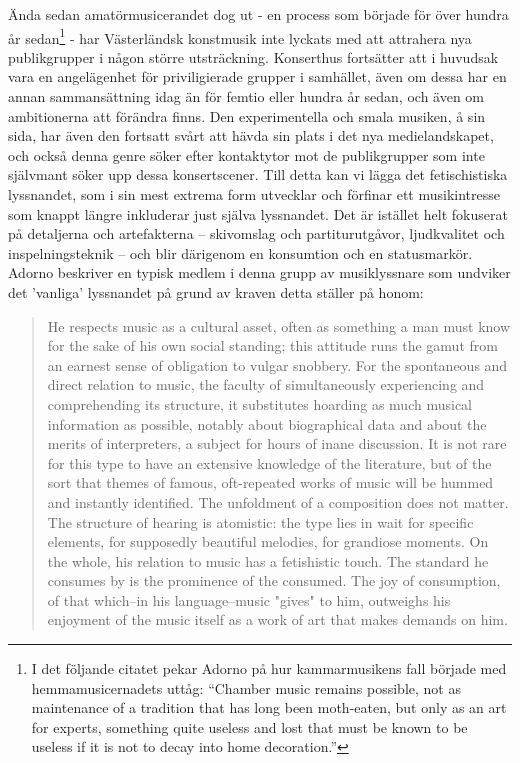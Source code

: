 \documentclass[12pt]{article}
\begin{document}
Ända sedan amatörmusicerandet dog ut - en process som började för över hundra år sedan\footnote{I det följande citatet pekar Adorno på hur kammarmusikens fall började med hemmamusicernadets uttåg: ``Chamber music remains possible, not as maintenance of a tradition that has long been moth-eaten, but only as an art for experts, something quite useless and lost that must be known to be useless if it is not to decay into home decoration.'' } - har Västerländsk konstmusik inte lyckats med att attrahera nya publikgrupper i någon större utsträckning. Konserthus fortsätter att i huvudsak vara en angelägenhet för priviligierade grupper i samhället, även om dessa har en annan sammansättning idag än för femtio eller hundra år sedan, och även om ambitionerna att förändra finns. Den experimentella och smala musiken, å sin sida, har även den fortsatt svårt att hävda sin plats i det nya medielandskapet, och också denna genre söker efter kontaktytor mot de publikgrupper som inte självmant söker upp dessa konsertscener. Till detta kan vi lägga det fetischistiska lyssnandet, som i sin mest extrema form utvecklar och förfinar ett musikintresse som knappt längre inkluderar just själva lyssnandet. Det är istället helt fokuserat på detaljerna och artefakterna -- skivomslag och partiturutgåvor, ljudkvalitet och inspelningsteknik -- och blir därigenom en konsumtion och en statusmarkör. Adorno beskriver en typisk medlem i denna grupp av musiklyssnare som undviker det 'vanliga' lyssnandet på grund av kraven detta ställer på honom:

\begin{quote}
He respects music as a cultural asset, often as something a man must know for the sake of his own social standing; this attitude runs the gamut from an earnest sense of obligation to vulgar snobbery. For the spontaneous and direct relation to music, the faculty of simultaneously experiencing and comprehending its structure, it substitutes hoarding as much musical information as possible, notably about biographical data and about the merits of interpreters, a subject for hours of inane discussion. It is not rare for this type to have an extensive knowledge of the literature, but of the sort that themes of famous, oft-repeated works of music will be hummed and instantly identified. The unfoldment of a composition does not matter. The structure of hearing is atomistic: the type lies in wait for specific elements, for supposedly beautiful melodies, for grandiose moments. On the whole, his relation to music has a fetishistic touch. The standard he consumes by is the prominence of the consumed. The joy of consumption, of that which--in his language--music "gives" to him, outweighs his enjoyment of the music itself as a work of art that makes demands on him. \citep[p.6-7]{adorno76}
\end{quote}
\end{document}
